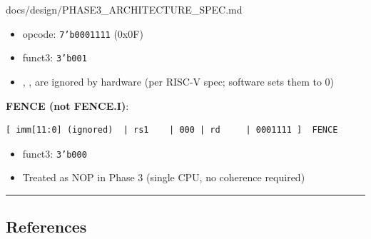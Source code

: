 \begin{relocated}{docs/design/PHASE3_ARCHITECTURE_SPEC.md}
\begin{itemize}
\tightlist
\item
  opcode: \texttt{7'b0001111} (0x0F)
\item
  funct3: \texttt{3'b001}
\item
  , ,  are ignored by hardware (per RISC-V
  spec; software sets them to 0)
\end{itemize}

\textbf{FENCE (not FENCE.I)}:

\begin{lstlisting}[language={}]
[ imm[11:0] (ignored)  | rs1    | 000 | rd     | 0001111 ]  FENCE
\end{lstlisting}

\begin{itemize}
\tightlist
\item
  funct3: \texttt{3'b000}
\item
  Treated as NOP in Phase 3 (single CPU, no coherence required)
\end{itemize}

\begin{center}\rule{0.5\linewidth}{0.5pt}\end{center}

\subsection{References}\label{ds:ch:phase3-architecture:14-references}


\end{relocated}

